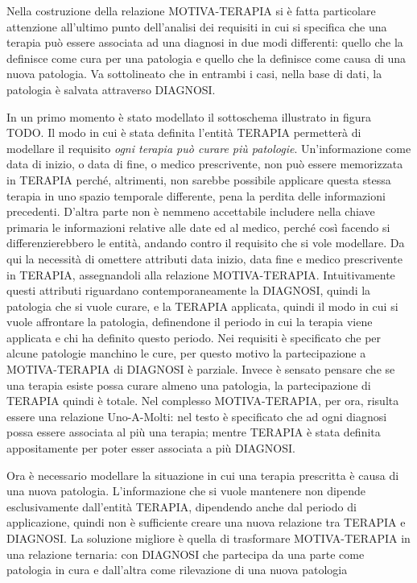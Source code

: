 \documentclass{article}
\begin{document}
                 

Nella costruzione della relazione MOTIVA-TERAPIA si è fatta particolare
attenzione all'ultimo punto dell'analisi dei requisiti in cui si specifica che
una terapia può essere associata ad una diagnosi in due modi differenti: quello
che la definisce come cura per una patologia e quello che la definisce come
causa di una nuova patologia.  Va sottolineato che in entrambi i casi, nella
base di dati, la patologia è salvata attraverso DIAGNOSI.

In un primo momento è stato modellato il sottoschema illustrato in figura TODO.
Il modo in cui è stata definita l'entità TERAPIA permetterà di modellare il
requisito \textit{ogni terapia può curare più patologie}.  Un'informazione come
data di inizio, o data di fine, o medico prescrivente, non può essere
memorizzata in TERAPIA perché, altrimenti, non sarebbe possibile applicare
questa stessa terapia in uno spazio temporale differente, pena la perdita delle
informazioni precedenti. D'altra parte non è nemmeno accettabile includere
nella chiave primaria le informazioni relative alle date ed al medico, perché
così facendo si differenzierebbero le entità, andando contro il requisito che
si vole modellare.  Da qui la necessità di omettere attributi data inizio, data
fine e medico prescrivente in TERAPIA, assegnandoli alla relazione
MOTIVA-TERAPIA.  Intuitivamente questi attributi riguardano contemporaneamente
la DIAGNOSI, quindi la patologia che si vuole curare, e la TERAPIA applicata,
quindi il modo in cui si vuole affrontare la patologia, definendone il periodo
in cui la terapia viene applicata e chi ha definito questo periodo.  Nei
requisiti è specificato che per alcune patologie manchino le cure, per questo
motivo la partecipazione a MOTIVA-TERAPIA di DIAGNOSI è parziale.  Invece è
sensato pensare che se una terapia esiste possa curare almeno una patologia, la
partecipazione di TERAPIA quindi è totale.  Nel complesso MOTIVA-TERAPIA, per
ora, risulta essere una relazione Uno-A-Molti: nel testo è specificato che ad
ogni diagnosi possa essere associata al più una terapia; mentre TERAPIA è stata
definita appositamente per poter esser associata a più DIAGNOSI.

Ora è necessario modellare la situazione in cui una terapia prescritta è causa
di una nuova patologia.  L'informazione che si vuole mantenere non dipende
esclusivamente dall'entità TERAPIA, dipendendo anche dal periodo di
applicazione, quindi non è sufficiente creare una nuova relazione tra TERAPIA e
DIAGNOSI.  La soluzione migliore è quella di trasformare MOTIVA-TERAPIA in una
relazione ternaria: con DIAGNOSI che partecipa da una parte come patologia in
cura e dall'altra come rilevazione di una nuova patologia
\end{document}

